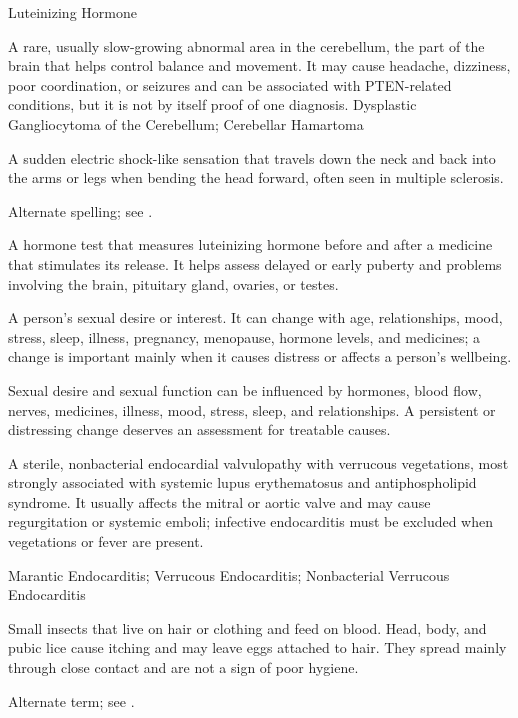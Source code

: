 \synonyms
Luteinizing Hormone

 A rare, usually slow-growing abnormal area in the cerebellum, the part of the brain that helps control balance and movement. It may cause headache, dizziness, poor coordination, or seizures and can be associated with PTEN-related conditions, but it is not by itself proof of one diagnosis.
\synonyms
Dysplastic Gangliocytoma of the Cerebellum; Cerebellar Hamartoma

 A sudden electric shock-like sensation that travels down the neck and back into the arms or legs when bending the head forward, often seen in multiple sclerosis.

 Alternate spelling; see .

 A hormone test that measures luteinizing hormone before and after a medicine that stimulates its release. It helps assess delayed or early puberty and problems involving the brain, pituitary gland, ovaries, or testes.

 A person's sexual desire or interest. It can change with age, relationships, mood, stress, sleep, illness, pregnancy, menopause, hormone levels, and medicines; a change is important mainly when it causes distress or affects a person's wellbeing.

 Sexual desire and sexual function can be influenced by hormones, blood flow, nerves, medicines, illness, mood, stress, sleep, and relationships. A persistent or distressing change deserves an assessment for treatable causes.

 A sterile, nonbacterial endocardial valvulopathy with verrucous vegetations, most strongly associated with systemic lupus erythematosus and antiphospholipid syndrome. It usually affects the mitral or aortic valve and may cause regurgitation or systemic emboli; infective endocarditis must be excluded when vegetations or fever are present.

\synonyms
Marantic Endocarditis; Verrucous Endocarditis; Nonbacterial Verrucous Endocarditis

 Small insects that live on hair or clothing and feed on blood. Head, body, and pubic lice cause itching and may leave eggs attached to hair. They spread mainly through close contact and are not a sign of poor hygiene.

 Alternate term; see .

